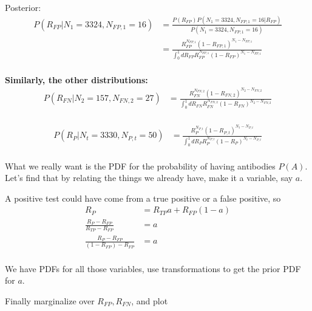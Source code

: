 Posterior:
\begin{align*}
    P(R_{FP}|N_1=3324, N_{FP,1}=16) &= \frac{P(R_{FP}) P(N_1=3324, N_{FP,1}=16 | R_{FP})}{P(N_1=3324, N_{FP,1}=16)} \\
    &= \frac{R_{FP}^{N_{FP,1}} (1-R_{FP,1})^{N_1-N_{FP,1}}}{\int_0^1 dR_{FP} R_{FP}^{N_{FP,1}} (1-R_{FP})^{N_1-N_{FP,1}}} \\
\end{align*}

\textbf{Similarly, the other distributions:}
\begin{align*}
    P(R_{FN}|N_2=157, N_{FN,2}=27) 
    &= \frac{R_{FN}^{N_{FN,2}} (1-R_{FN,2})^{N_2-N_{FN,2}}}{\int_0^1 dR_{FN} R_{FN}^{N_{FN,2}} (1-R_{FN})^{N_2-N_{FN,2}}} \\
\end{align*}

\begin{align*}
    P(R_{P}| N_t=3330, N_{P,t}=50) 
    &= \frac{R_{P}^{N_{P,t}} (1-R_{P,t})^{N_t-N_{P,t}}}{\int_0^1 dR_{P} R_{P}^{N_{P,t}} (1-R_{P})^{N_t-N_{P,t}}} \\
\end{align*}

What we really want is the PDF for the probability of having antibodies $P(A)$. Let's find that by relating the things we already have, make it a variable, say $a$.

A positive test could have come from a true positive or a false positive, so
\begin{align*}
    R_{P} &= R_{TP}a + R_{FP}(1-a) \\
    \frac{R_{P} - R_{FP}}{R_{TP} - R_{FP}} &= a  \\
    \frac{R_{P} - R_{FP}}{(1-R_{FP}) - R_{FP}} &= a  \\
\end{align*}

We have PDFs for all those variables, use transformations to get the prior PDF for $a$.


Finally marginalize over $R_{FP}, R_{FN}$, and plot



